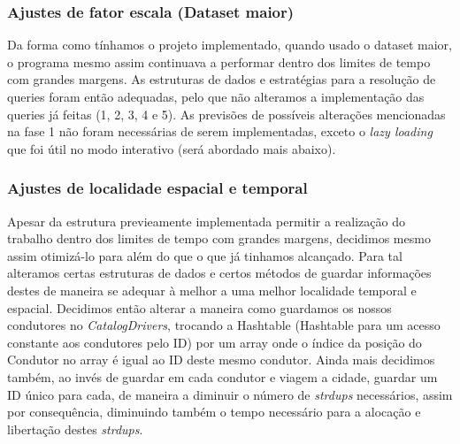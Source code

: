 \documentclass{article}
\begin{document}
        \subsubsection{Ajustes de fator escala (Dataset maior)}
            Da forma como tínhamos o projeto implementado, quando 
            usado o dataset maior, o programa mesmo assim continuava
            a performar dentro dos limites de tempo com grandes 
            margens. As estruturas de dados e estratégias para
            a resolução de queries foram então adequadas, pelo que
            não alteramos a implementação das queries já feitas
            (1, 2, 3, 4 e 5). As previsões de possíveis alterações
            mencionadas na fase 1 não foram necessárias de serem
            implementadas, exceto o \emph{lazy loading} que foi
            útil no modo interativo (será abordado mais abaixo).

        \subsubsection{Ajustes de localidade espacial e temporal}
            Apesar da estrutura previeamente implementada permitir 
            a realização do trabalho dentro dos limites de tempo 
            com grandes margens, decidimos mesmo assim otimizá-lo 
            para além do que o que já tinhamos alcançado. Para tal
            alteramos certas estruturas de dados e certos métodos de 
            guardar informações destes de maneira se adequar à melhor 
            a uma melhor localidade temporal e espacial. Decidimos então 
            alterar a maneira como guardamos os nossos condutores no 
            \emph{CatalogDrivers}, trocando a Hashtable (Hashtable para um 
            acesso constante aos condutores pelo ID) por um array onde o índice 
            da posição do Condutor no array é igual ao ID deste mesmo condutor.
            Ainda mais decidimos também, ao invés de guardar em cada condutor 
            e viagem a cidade, guardar um ID único para cada, de maneira a 
            diminuir o número de \emph{strdups} necessários, assim por consequência,
            diminuindo também o tempo necessário para a alocação e libertação destes
             \emph{strdups}.
            
        
\end{document}
